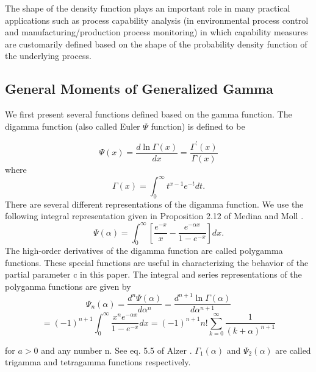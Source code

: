 \documentclass{ps}
\theoremstyle{plain}%
\theoremstyle{definition}
\theoremstyle{remark}
\begin{document}
The shape of the density function plays an important role in many practical applications such as process capability analysis (in environmental process control and manufacturing/production process monitoring) in which capability measures are customarily defined based on the shape of the probability density function of the underlying process.


\subsection{General Moments of Generalized Gamma}\label{sec3.1: preliminary-Digamma}


We first present several functions defined based on the gamma function. The digamma function (also called Euler $\Psi$ function) is defined to be


\begin{equation}\label{digamma-fun}
	\Psi(x) = \frac{d \ln\Gamma(x)}{dx} = \frac{\Gamma^\prime (x)}{\Gamma(x)}
\end{equation}
\noindent where
$$
\Gamma(x) = \int_0^\infty t^{x-1}e^{-t}dt.
$$
There are several different representations of the digamma function. We use the following integral representation given in Proposition 2.12 of Medina and Moll \cite{Medina-Moll-2009}.
$$
\Psi(\alpha) = \int_0^\infty \left[\frac{e^{-x}}{x}-\frac{e^{-\alpha x}}{1-e^{-x}} \right]dx.
$$
The high-order derivatives of the digamma function are called polygamma functions. These special functions are useful in characterizing the behavior of the partial parameter c in this paper. The integral and series representations of the polyganma functions are given by
$$
\Psi_n(\alpha)=\frac{d^n\Psi(\alpha)}{d\alpha^n} = \frac{d^{n+1}\ln \Gamma(\alpha)}{d\alpha^{n+1}} 
$$
\begin{equation}\label{polygamma-fun}
	= (-1)^{n+1}\int_0^\infty \frac{x^n e^{-\alpha x}}{1-e^{-x}}dx = (-1)^{n+1}n!\sum_{k=0}^\infty \frac{1}{(k+\alpha)^{n+1}}
\end{equation}

\noindent for $a > 0$ and any number n. See eq. 5.5 of Alzer \cite{Alzer-1997}. $\Gamma_1(\alpha)$ and $\Psi_2(\alpha)$ are called trigamma and tetragamma functions respectively.
\end{document}
